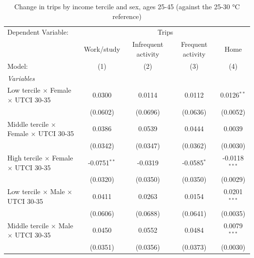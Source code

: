 
\begin{table}[htbp]
   \caption{\label{table_rq3_25-45} Change in trips by income tercile and sex, ages 25-45 (against the 25-30 °C reference)}
   \centering
   \scriptsize
   \renewcommand*{\arraystretch}{0.75}
   \begin{tabular}{lcccc}
      \tabularnewline \midrule \midrule
      Dependent Variable: & \multicolumn{4}{c}{Trips}\\
                                                           & Work/study      & Infrequent activity & Frequent activity & Home \\   
      Model:                                               & (1)             & (2)                 & (3)               & (4)\\  
      \midrule
      \emph{Variables}\\
      Low tercile $\times$ Female $\times$ UTCI 30-35      & 0.0300          & 0.0114              & 0.0112            & 0.0126$^{**}$\\   
                                                           & (0.0602)        & (0.0696)            & (0.0636)          & (0.0052)\\   
      Middle tercile $\times$ Female $\times$ UTCI 30-35   & 0.0386          & 0.0539              & 0.0444            & 0.0039\\   
                                                           & (0.0342)        & (0.0347)            & (0.0362)          & (0.0030)\\   
      High tercile $\times$ Female $\times$ UTCI 30-35     & -0.0751$^{**}$  & -0.0319             & -0.0585$^{*}$     & -0.0118$^{***}$\\   
                                                           & (0.0320)        & (0.0350)            & (0.0350)          & (0.0029)\\   
      Low tercile $\times$ Male $\times$ UTCI 30-35        & 0.0411          & 0.0263              & 0.0154            & 0.0201$^{***}$\\   
                                                           & (0.0606)        & (0.0688)            & (0.0641)          & (0.0035)\\   
      Middle tercile $\times$ Male $\times$ UTCI 30-35     & 0.0450          & 0.0552              & 0.0484            & 0.0079$^{***}$\\   
                                                           & (0.0351)        & (0.0356)            & (0.0373)          & (0.0030)\\   

\end{tabular}
\end{table}
